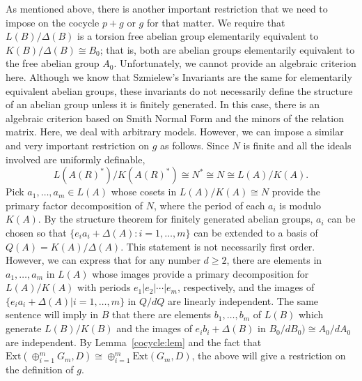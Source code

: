 \documentclass{article}
\theoremstyle{remark}
\def\Ext{\text{Ext}}
\begin{document}
As mentioned above, there is another important restriction that we need to impose on the cocycle $p+g$ or $g$ for that matter. We require that $L(B)/\Delta(B)$ is a torsion free abelian group elementarily equivalent to $K(B)/\Delta(B)\cong B_0$; that is, both are abelian groups elementarily equivalent to the free abelian group $A_0$. 
Unfortunately, we cannot provide an algebraic criterion here. Although we know that Szmielew’s Invariants are the same for elementarily equivalent abelian groups, these invariants do not necessarily define the structure of an abelian group unless it is finitely generated. In this case, there is an algebraic criterion based on Smith Normal Form and the minors of the relation matrix. Here, we deal with arbitrary models. However, we can impose a similar and very important restriction on $g$ as follows.  Since $N$ is finite and all the ideals involved are uniformly definable,  $$L(A(R)^*)/K(A(R)^*)\cong N^*\cong N\cong L(A)/K(A).$$ Pick $a_1, \ldots, a_m \in L(A)$ whose cosets in $L(A)/K(A)\cong N$ provide the primary factor decomposition of $N$, where the period of each $a_i$ is modulo $K(A)$. By the structure theorem for finitely generated abelian groups, $a_i$ can be chosen so that $\{e_ia_i+\Delta(A):i=1,\ldots, m\}$ can be extended to a basis of $Q(A)=K(A)/\Delta(A)$. This statement is not necessarily first order. However, we can express that for any number $d\geq 2$, there are elements in $a_1, \ldots, a_m$ in $L(A)$ whose images provide a primary decomposition for $L(A)/K(A)$ with periods $e_1|e_2|\cdots|e_m$, respectively, and the images of $\{e_ia_i+\Delta(A)|i=1,\ldots,m\}$ in $Q/dQ$ are linearly independent.  The same sentence will imply in $B$ that there are elements  $b_1, \ldots, b_m$ of $L(B)$ which generate $L(B)/K(B)$ and the images of $e_ib_i+\Delta(B)$ in $B_0/dB_0)\cong A_0/dA_0$ are independent. By Lemma~\ref{cocycle:lem} and the fact that $\Ext(\oplus_{i=1}^m G_m,D)\cong \oplus_{i=1}^m\Ext( G_m,D)$, the above will give a restriction on the definition of $g$.     

\end{document}
